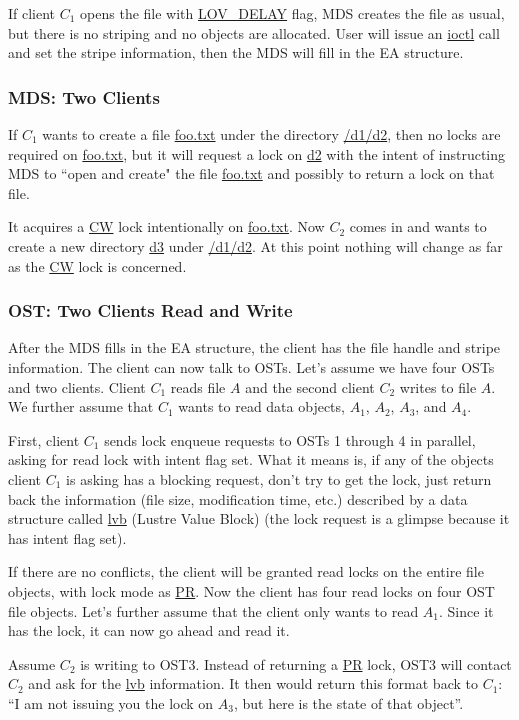 If client $C_1$ opens the file with \url{LOV_DELAY} flag, MDS creates the file
as usual, but there is no striping and no objects are allocated. User will
issue an \url{ioctl} call and set the stripe information, then the MDS will
fill in the EA structure.

\subsubsection*{MDS: Two Clients}

If $C_1$ wants to create a file \url{foo.txt} under the directory \url{/d1/d2},
then no locks are required on \url{foo.txt}, but it will request a lock on
\url{d2} with the intent of instructing MDS to ``open and create" the file
\url{foo.txt} and possibly to return a lock on that file.

It acquires a \url{CW} lock intentionally on \url{foo.txt}.  Now $C_2$ comes in
and wants to create a new directory \url{d3} under \url{/d1/d2}. At this point
nothing will change as far as the \url{CW} lock is concerned.

\subsubsection*{OST: Two Clients Read and Write}

After the MDS fills in the EA structure, the client has the file handle and
stripe information. The client can now talk to OSTs. Let's assume we have four OSTs
and two clients. Client $C_1$ reads file $A$ and the second client $C_2$
writes to file $A$. We further assume that $C_1$ wants to read data objects,
$A_1$, $A_2$, $A_3$, and $A_4$.

First, client $C_1$ sends lock enqueue requests to OSTs 1 through 4 in
parallel, asking for read lock with intent flag set. What it means is, if any
of the objects client $C_1$ is asking has a blocking request, don't try to get
the lock, just return back the information (file size, modification time, etc.)
described by a data structure called \url{lvb} (Lustre Value Block) (the lock
request is a glimpse because it has intent flag set). 

If there are no conflicts, the client will be granted read locks on the
entire file objects, with lock mode as \url{PR}. Now the client has four read
locks on four OST file objects. Let's further assume that the client only wants to
read $A_1$. Since it has the lock, it can now go ahead and read it.

Assume $C_2$ is writing to OST3. Instead of returning a \url{PR} lock, OST3
will contact $C_2$ and ask for the \url{lvb} information. It then would return
this format back to $C_1$: ``I am not issuing you the lock on $A_3$, but here
is the state of that object''.

